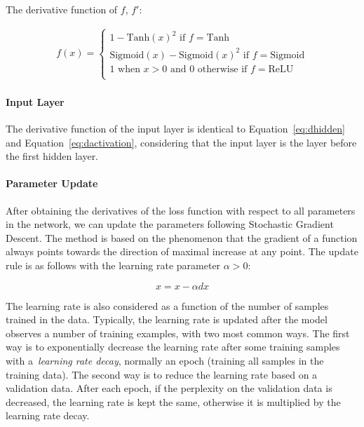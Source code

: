 The derivative function of $f$, $f'$:

\begin{equation}
\begin{aligned}
f(x) = 
\begin{cases}
1 - \text{Tanh}(x)^2   \text{    if } f = \text{Tanh} \\
\text{Sigmoid}(x) - \text{Sigmoid}(x)^2                \text{     if } f = \text{Sigmoid} \\
1 \text{ when } x > 0 \text{ and 0 otherwise}  \text{     if } f = \text{ReLU} \\
\end{cases}
\label{eq:dactivation}
\end{aligned}
\end{equation}


\paragraph{Input Layer}

The derivative function of the input layer is identical to Equation~\ref{eq:dhidden} and Equation~\ref{eq:dactivation}, considering that the input layer is the layer before the first hidden layer. 

\paragraph{Parameter Update}

After obtaining the derivatives of the loss function with respect to all parameters in the network, we can update the parameters following Stochastic Gradient Descent. The method is based on the phenomenon that the gradient of a function always points towards the direction of maximal increase at any point. The update rule is as follows with the learning rate parameter $\alpha > 0$:

\begin{equation}
x = x - \alpha dx
\label{eq:sgd}
\end{equation}

The learning rate is also considered as a function of the number of samples trained in the data. Typically, the learning rate is updated after the model observes a number of training examples, with two most common ways. The first way is to exponentially decrease the learning rate after some training samples with a~\textit{learning rate decay}, normally an epoch (training all samples in the training data). The second way is to reduce the learning rate based on a validation data. After each epoch, if the perplexity on the validation data is decreased, the learning rate is kept the same, otherwise it is multiplied by the learning rate decay.


